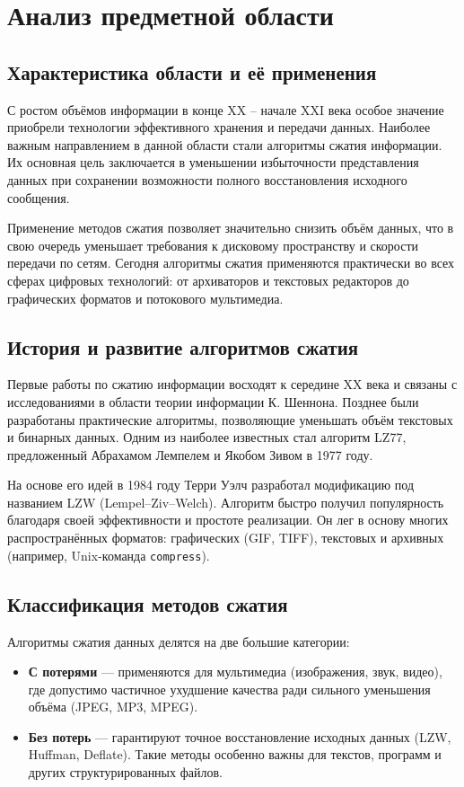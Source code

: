\section{Анализ предметной области}
\subsection{Характеристика области и её применения}

С ростом объёмов информации в конце XX – начале XXI века особое значение приобрели технологии эффективного хранения и передачи данных. Наиболее важным направлением в данной области стали алгоритмы сжатия информации. Их основная цель заключается в уменьшении избыточности представления данных при сохранении возможности полного восстановления исходного сообщения. 

Применение методов сжатия позволяет значительно снизить объём данных, что в свою очередь уменьшает требования к дисковому пространству и скорости передачи по сетям. Сегодня алгоритмы сжатия применяются практически во всех сферах цифровых технологий: от архиваторов и текстовых редакторов до графических форматов и потокового мультимедиа. 

\subsection{История и развитие алгоритмов сжатия}

Первые работы по сжатию информации восходят к середине XX века и связаны с исследованиями в области теории информации К. Шеннона. Позднее были разработаны практические алгоритмы, позволяющие уменьшать объём текстовых и бинарных данных. Одним из наиболее известных стал алгоритм LZ77, предложенный Абрахамом Лемпелем и Якобом Зивом в 1977 году. 

На основе его идей в 1984 году Терри Уэлч разработал модификацию под названием LZW (Lempel–Ziv–Welch). Алгоритм быстро получил популярность благодаря своей эффективности и простоте реализации. Он лег в основу многих распространённых форматов: графических (GIF, TIFF), текстовых и архивных (например, Unix-команда \texttt{compress}). 

\subsection{Классификация методов сжатия}

Алгоритмы сжатия данных делятся на две большие категории:  
\begin{itemize}
	\item \textbf{С потерями} — применяются для мультимедиа (изображения, звук, видео), где допустимо частичное ухудшение качества ради сильного уменьшения объёма (JPEG, MP3, MPEG).  
	\item \textbf{Без потерь} — гарантируют точное восстановление исходных данных (LZW, Huffman, Deflate). Такие методы особенно важны для текстов, программ и других структурированных файлов.  
\end{itemize}

